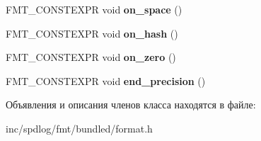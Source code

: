\begin{DoxyCompactItemize}
F\+M\+T\+\_\+\+C\+O\+N\+S\+T\+E\+X\+PR void {\bfseries on\+\_\+space} ()
\item 
\mbox{\label{classinternal_1_1specs__checker_a90ca884ae61ca7badce5ca112cd168bb}} 
F\+M\+T\+\_\+\+C\+O\+N\+S\+T\+E\+X\+PR void {\bfseries on\+\_\+hash} ()
\item 
\mbox{\label{classinternal_1_1specs__checker_a424213bfc129a687ad3dd6d6e872139f}} 
F\+M\+T\+\_\+\+C\+O\+N\+S\+T\+E\+X\+PR void {\bfseries on\+\_\+zero} ()
\item 
\mbox{\label{classinternal_1_1specs__checker_a0c16ee4bc2e70bb2c3e736e195dcd870}} 
F\+M\+T\+\_\+\+C\+O\+N\+S\+T\+E\+X\+PR void {\bfseries end\+\_\+precision} ()
\end{DoxyCompactItemize}


Объявления и описания членов класса находятся в файле\+:\begin{DoxyCompactItemize}
\item 
inc/spdlog/fmt/bundled/format.\+h\end{DoxyCompactItemize}
